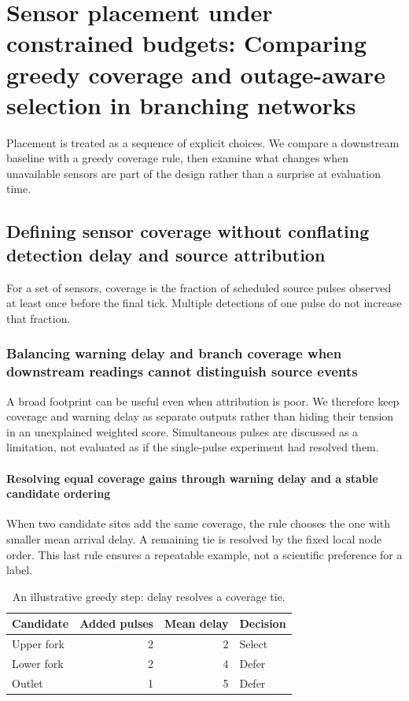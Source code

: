\chapter{Sensor placement under constrained budgets: Comparing greedy coverage and outage-aware selection in branching networks}\label{demo-placement}
Placement is treated as a sequence of explicit choices. We compare a downstream baseline with a greedy coverage rule, then examine what changes when unavailable sensors are part of the design rather than a surprise at evaluation time.
\section{Defining sensor coverage without conflating detection delay and source attribution}\label{demo-placement-objective}
For a set of sensors, coverage is the fraction of scheduled source pulses observed at least once before the final tick. Multiple detections of one pulse do not increase that fraction.
\subsection{Balancing warning delay and branch coverage when downstream readings cannot distinguish source events}\label{demo-placement-coverage}
A broad footprint can be useful even when attribution is poor. We therefore keep coverage and warning delay as separate outputs rather than hiding their tension in an unexplained weighted score. Simultaneous pulses are discussed as a limitation, not evaluated as if the single-pulse experiment had resolved them.
\subsubsection{Resolving equal coverage gains through warning delay and a stable candidate ordering}\label{demo-placement-ties}
When two candidate sites add the same coverage, the rule chooses the one with smaller mean arrival delay. A remaining tie is resolved by the fixed local node order. This last rule ensures a repeatable example, not a scientific preference for a label.
\begin{table}[htbp]
\centering
\begin{tabular}{lrrl}
\hline
Candidate & Added pulses & Mean delay & Decision \\
\hline
Upper fork & 2 & 2 & Select \\
Lower fork & 2 & 4 & Defer \\
Outlet & 1 & 5 & Defer \\
\hline
\end{tabular}
\caption{An illustrative greedy step: delay resolves a coverage tie.}\label{demo-tab-ties}
\end{table}
